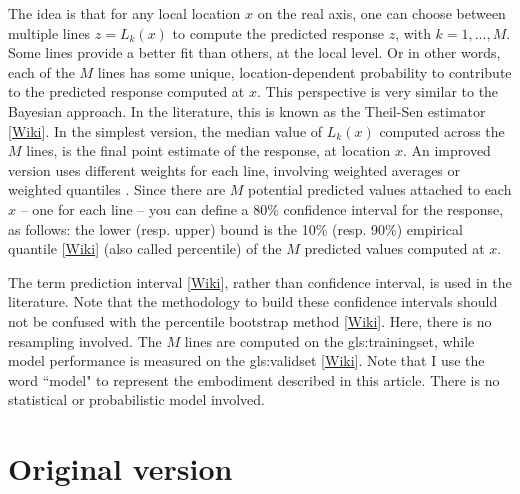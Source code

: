 \documentclass[oneside,10pt]{book}
\begin{document}
The idea is that for any local location $x$ on the real axis, one can choose between multiple lines $z=L_k(x)$ to compute the predicted response $z$, with 
$k=1,\dots,M$. Some lines provide a better fit than others, at the local level. Or in other words, each of the $M$ lines has some unique, location-dependent  
probability to contribute to the predicted response computed at $x$. This perspective is very similar to the Bayesian approach.  In the literature, this is known as the
\textcolor{index}{Theil-Sen estimator} [\href{https://mltblog.com/3LomHbJ}{Wiki}]. In the simplest version, the median value of $L_k(x)$ computed across the $M$ lines, is the final
point estimate of the response, at location $x$. An improved version uses different weights for each line, involving weighted averages or 
\textcolor{index}{weighted quantiles} \cite{wpnumpy}. 
Since there are $M$ potential predicted values attached to each $x$ -- one for each line -- you can define
a 80\% confidence interval for the response, as follows: the lower (resp. upper) bound is the 10\% (resp. 90\%) \textcolor{index}{empirical quantile}
[\href{https://en.wikipedia.org/wiki/Quantile}{Wiki}] (also called percentile) of the $M$ predicted values computed at $x$. 

The term 
\textcolor{index}{prediction interval} [\href{https://en.wikipedia.org/wiki/Prediction_interval}{Wiki}], rather than confidence interval, is used in the literature. 
Note that the methodology to build these confidence intervals should not be confused with the \textcolor{index}{percentile bootstrap method} [\href{https://stats.stackexchange.com/questions/355781/is-it-true-that-the-percentile-bootstrap-should-never-be-used}{Wiki}]. Here, there is no resampling involved. The $M$ lines are computed on the \gls{gls:trainingset}, while model performance is measured on the 
\gls{gls:validset} [\href{https://en.wikipedia.org/wiki/Training,_validation,_and_test_data_sets}{Wiki}]. Note that I use the word ``model" to represent the embodiment described in this article. There is no
statistical or probabilistic model involved.  

\section{Original version}\label{fuzzy1}
\end{document}
